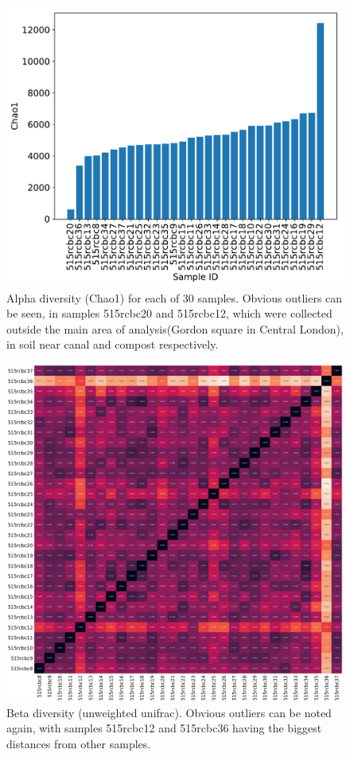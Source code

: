 \documentclass{article}
\begin{document}
\begin{multicols}{2}
\begin{figure}[H]
	\captionsetup{width=\linewidth}
	\includegraphics[width=\linewidth]{../analyses/figs/chao1_alpha.pdf}
	\caption{Alpha diversity (Chao1) for each of 30 samples. Obvious outliers can be seen, in samples 515rcbc20 and 515rcbc12, which were collected outside the main area of analysis(Gordon square in Central London), in soil near canal and compost respectively.}
	\label{fig:alpha_diversity}
\end{figure}
\begin{figure}[H]
	\captionsetup{width=\linewidth}
	\includegraphics[width=\linewidth]{../analyses/figs/unweighted_beta.png}
	\caption{Beta diversity (unweighted unifrac). Obvious outliers can be noted again, with samples 515rcbc12 and 515rcbc36 having the biggest distances from other samples.}
	\label{fig:beta_diversity}
\end{figure}


\end{multicols}
\end{document}
